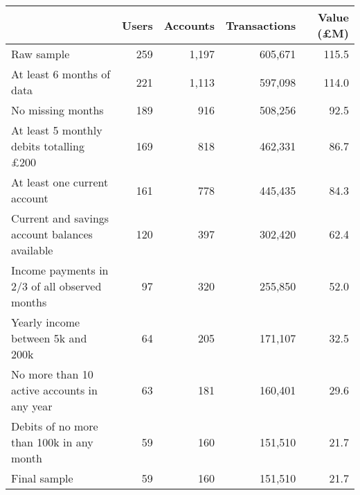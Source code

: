 \begin{tabular}{lrrrr}
\toprule
                                               & Users & Accounts & Transactions & Value (\pounds M) \\
\midrule
                                    Raw sample &   259 &    1,197 &      605,671 &             115.5 \\
                     At least 6 months of data &   221 &    1,113 &      597,098 &             114.0 \\
                             No missing months &   189 &      916 &      508,256 &              92.5 \\
At least 5 monthly debits totalling \pounds200 &   169 &      818 &      462,331 &              86.7 \\
                  At least one current account &   161 &      778 &      445,435 &              84.3 \\
Current and savings account balances available &   120 &      397 &      302,420 &              62.4 \\
 Income payments in 2/3 of all observed months &    97 &      320 &      255,850 &              52.0 \\
             Yearly income between 5k and 200k &    64 &      205 &      171,107 &              32.5 \\
   No more than 10 active accounts in any year &    63 &      181 &      160,401 &              29.6 \\
      Debits of no more than 100k in any month &    59 &      160 &      151,510 &              21.7 \\
                                  Final sample &    59 &      160 &      151,510 &              21.7 \\
\bottomrule
\end{tabular}
